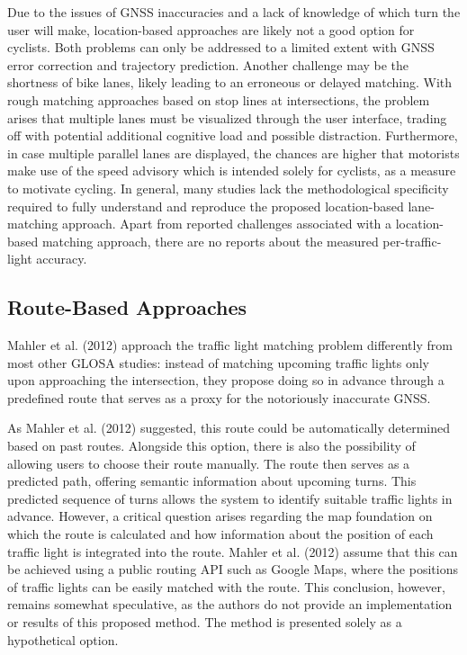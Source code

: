 Due to the issues of GNSS inaccuracies and a lack of knowledge of which turn the user will make, location-based approaches are likely not a good option for cyclists. Both problems can only be addressed to a limited extent with GNSS error correction and trajectory prediction. Another challenge may be the shortness of bike lanes, likely leading to an erroneous or delayed matching. With rough matching approaches based on stop lines at intersections, the problem arises that multiple lanes must be visualized through the user interface, trading off with potential additional cognitive load and possible distraction. Furthermore, in case multiple parallel lanes are displayed, the chances are higher that motorists make use of the speed advisory which is intended solely for cyclists, as a measure to motivate cycling. In general, many studies lack the methodological specificity required to fully understand and reproduce the proposed location-based lane-matching approach. Apart from reported challenges associated with a location-based matching approach, there are no reports about the measured per-traffic-light accuracy. 

\subsection{Route-Based Approaches}

Mahler et al. (2012) \cite{mahler_reducing_2012} approach the traffic light matching problem differently from most other GLOSA studies: instead of matching upcoming traffic lights only upon approaching the intersection, they propose doing so in advance through a predefined route that serves as a proxy for the notoriously inaccurate GNSS.

As Mahler et al. (2012) \cite{mahler_reducing_2012} suggested, this route could be automatically determined based on past routes. Alongside this option, there is also the possibility of allowing users to choose their route manually. The route then serves as a predicted path, offering semantic information about upcoming turns. This predicted sequence of turns allows the system to identify suitable traffic lights in advance. However, a critical question arises regarding the map foundation on which the route is calculated and how information about the position of each traffic light is integrated into the route. Mahler et al. (2012) \cite{mahler_reducing_2012} assume that this can be achieved using a public routing API such as Google Maps, where the positions of traffic lights can be easily matched with the route. This conclusion, however, remains somewhat speculative, as the authors do not provide an implementation or results of this proposed method. The method is presented solely as a hypothetical option.

